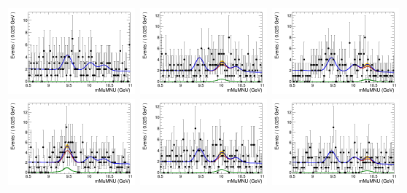 \begin{figure}[!htbp]
\begin{center}
 \includegraphics[width=0.3\textwidth]{figures_and_tables/modeling_xchecks/plots/HToUpsilon1SPhoton_Cat0_signalStrenght_100000/Cat0_mMuMNU_fit_s}
\includegraphics[width=0.3\textwidth]{figures_and_tables/modeling_xchecks/plots/HToUpsilon2SPhoton_Cat0_signalStrenght_100000/Cat0_mMuMNU_fit_s}
\includegraphics[width=0.3\textwidth]{figures_and_tables/modeling_xchecks/plots/HToUpsilon3SPhoton_Cat0_signalStrenght_100000/Cat0_mMuMNU_fit_s}
\includegraphics[width=0.3\textwidth]{figures_and_tables/modeling_xchecks/plots/HToUpsilon1SPhoton_Cat0_signalStrenght_200000/Cat0_mMuMNU_fit_s}
\includegraphics[width=0.3\textwidth]{figures_and_tables/modeling_xchecks/plots/HToUpsilon2SPhoton_Cat0_signalStrenght_200000/Cat0_mMuMNU_fit_s}
\includegraphics[width=0.3\textwidth]{figures_and_tables/modeling_xchecks/plots/HToUpsilon3SPhoton_Cat0_signalStrenght_200000/Cat0_mMuMNU_fit_s}

\end{center}
\end{figure}
